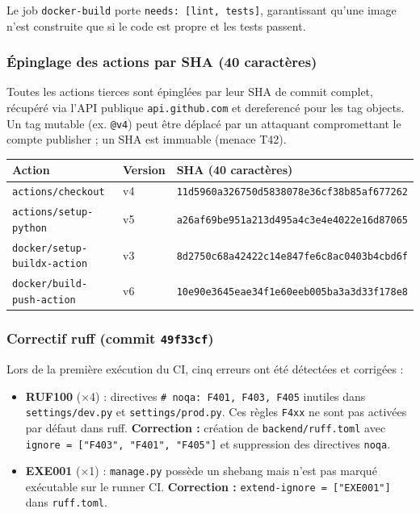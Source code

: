 \documentclass[11pt,a4paper]{article}
\begin{document}
Le job \texttt{docker-build} porte \texttt{needs: [lint, tests]}, garantissant qu'une image
n'est construite que si le code est propre et les tests passent.

\subsubsection*{Épinglage des actions par SHA (40 caractères)}

Toutes les actions tierces sont épinglées par leur SHA de commit complet, récupéré via
l'API publique \texttt{api.github.com} et dereferencé pour les tag objects. Un tag mutable
(ex. \texttt{@v4}) peut être déplacé par un attaquant compromettant le compte publisher ;
un SHA est immuable (menace T42).

\begin{center}
\renewcommand{\arraystretch}{1.3}
\begin{tabular}{llp{7cm}}
  \toprule
  \textbf{Action} & \textbf{Version} & \textbf{SHA (40 caractères)} \\
  \midrule
  \texttt{actions/checkout}           & v4 &
    \texttt{11d5960a326750d5838078e36cf38b85af677262} \\
  \texttt{actions/setup-python}       & v5 &
    \texttt{a26af69be951a213d495a4c3e4e4022e16d87065} \\
  \texttt{docker/setup-buildx-action} & v3 &
    \texttt{8d2750c68a42422c14e847fe6c8ac0403b4cbd6f} \\
  \texttt{docker/build-push-action}   & v6 &
    \texttt{10e90e3645eae34f1e60eeb005ba3a3d33f178e8} \\
  \bottomrule
\end{tabular}
\end{center}

\subsubsection*{Correctif ruff (commit \texttt{49f33cf})}

Lors de la première exécution du CI, cinq erreurs ont été détectées et corrigées :

\begin{itemize}
  \item \textbf{RUF100} (×4) : directives \texttt{\# noqa: F401, F403, F405} inutiles dans
    \texttt{settings/dev.py} et \texttt{settings/prod.py}. Ces règles \texttt{F4xx} ne sont
    pas activées par défaut dans ruff.
    \textbf{Correction :} création de \texttt{backend/ruff.toml} avec
    \texttt{ignore = ["F403", "F401", "F405"]} et suppression des directives
    \texttt{noqa}.
  \item \textbf{EXE001} (×1) : \texttt{manage.py} possède un shebang mais n'est pas marqué
    exécutable sur le runner CI.
    \textbf{Correction :} \texttt{extend-ignore = ["EXE001"]} dans \texttt{ruff.toml}.
\end{itemize}
\end{document}

